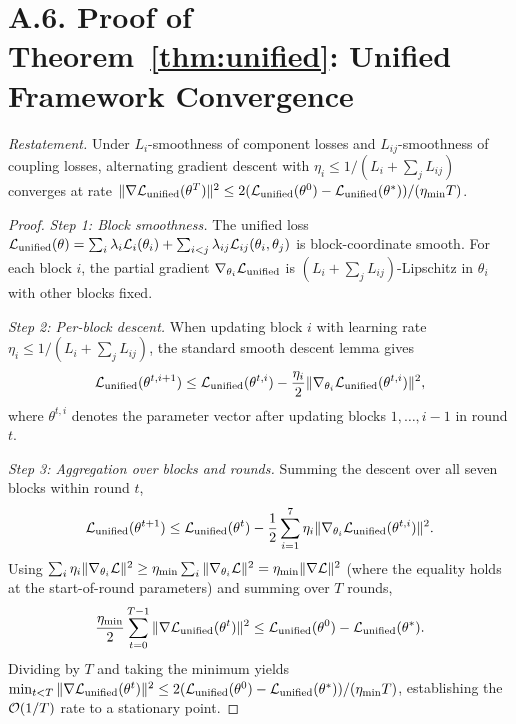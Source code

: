 \section*{A.6. Proof of Theorem~\ref{thm:unified}: Unified Framework Convergence}
\label{app:proof_unified}

\noindent\textit{Restatement.} Under $L_i$-smoothness of component losses and $L_{ij}$-smoothness of coupling losses, alternating gradient descent with $\eta_i\le 1/(L_i+\sum_j L_{ij})$ converges at rate $\|\nabla\mathcal{L}_{\mathrm{unified}}(\theta^T)\|^2\le 2(\mathcal{L}_{\mathrm{unified}}(\theta^0)-\mathcal{L}_{\mathrm{unified}}(\theta^*))/(\eta_{\min}T)$.

\begin{proof}
\textit{Step 1: Block smoothness.} The unified loss $\mathcal{L}_{\mathrm{unified}}(\theta) = \sum_i\lambda_i\mathcal{L}_i(\theta_i) + \sum_{i<j}\lambda_{ij}\mathcal{L}_{ij}(\theta_i,\theta_j)$ is block-coordinate smooth. For each block $i$, the partial gradient $\nabla_{\theta_i}\mathcal{L}_{\mathrm{unified}}$ is $(L_i+\sum_j L_{ij})$-Lipschitz in $\theta_i$ with other blocks fixed.

\textit{Step 2: Per-block descent.} When updating block $i$ with learning rate $\eta_i\le 1/(L_i+\sum_j L_{ij})$, the standard smooth descent lemma gives
\begin{equation}
\mathcal{L}_{\mathrm{unified}}(\theta^{t,i+1}) \le \mathcal{L}_{\mathrm{unified}}(\theta^{t,i}) - \frac{\eta_i}{2}\|\nabla_{\theta_i}\mathcal{L}_{\mathrm{unified}}(\theta^{t,i})\|^2,
\end{equation}
where $\theta^{t,i}$ denotes the parameter vector after updating blocks $1,\ldots,i{-}1$ in round $t$.

\textit{Step 3: Aggregation over blocks and rounds.} Summing the descent over all seven blocks within round $t$,
\begin{equation}
\mathcal{L}_{\mathrm{unified}}(\theta^{t+1}) \le \mathcal{L}_{\mathrm{unified}}(\theta^{t}) - \frac{1}{2}\sum_{i=1}^7\eta_i\|\nabla_{\theta_i}\mathcal{L}_{\mathrm{unified}}(\theta^{t,i})\|^2.
\end{equation}
Using $\sum_i\eta_i\|\nabla_{\theta_i}\mathcal{L}\|^2\ge\eta_{\min}\sum_i\|\nabla_{\theta_i}\mathcal{L}\|^2 = \eta_{\min}\|\nabla\mathcal{L}\|^2$ (where the equality holds at the start-of-round parameters) and summing over $T$ rounds,
\begin{equation}
\frac{\eta_{\min}}{2}\sum_{t=0}^{T-1}\|\nabla\mathcal{L}_{\mathrm{unified}}(\theta^t)\|^2
\le \mathcal{L}_{\mathrm{unified}}(\theta^0) - \mathcal{L}_{\mathrm{unified}}(\theta^*).
\end{equation}
Dividing by $T$ and taking the minimum yields $\min_{t<T}\|\nabla\mathcal{L}_{\mathrm{unified}}(\theta^t)\|^2\le 2(\mathcal{L}_{\mathrm{unified}}(\theta^0)-\mathcal{L}_{\mathrm{unified}}(\theta^*))/(\eta_{\min}T)$, establishing the $\mathcal{O}(1/T)$ rate to a stationary point.
\end{proof}



